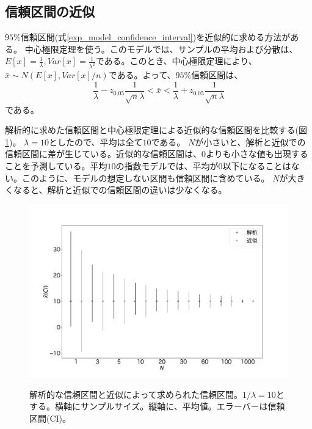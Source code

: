 \subsection{信頼区間の近似}
$95\%$信頼区間(式\ref{exp_model_confidence_interval})を近似的に求める方法がある。
中心極限定理を使う。このモデルでは、サンプルの平均および分散は、$E[x]=\frac{1}{\lambda},Var[x]=\frac{1}{\lambda^2}$である。このとき、中心極限定理により、$\bar{x}\sim N(E[x],Var[x]/n)$である。よって、$95\%$信頼区間は、
\begin{equation*}
    \frac{1}{\lambda}-z_{0.05}\frac{1}{\sqrt{n}\lambda}<\bar{x}<\frac{1}{\lambda}+z_{0.05}\frac{1}{\sqrt{n}\lambda}
\end{equation*}
である。

解析的に求めた信頼区間と中心極限定理による近似的な信頼区間を比較する(図\ref{fig:model_predict_CI_interval})。
$\lambda=10$としたので、平均は全て$10$である。
$N$が小さいと、解析と近似での信頼区間に差が生じている。近似的な信頼区間は、$0$よりも小さな値も出現することを予測している。平均$10$の指数モデルでは、平均が$0$以下になることはない。このように、モデルの想定しない区間も信頼区間に含めている。
$N$が大きくなると、解析と近似での信頼区間の違いは少なくなる。

\begin{figure}
    \begin{center}
        \includegraphics[width=15cm]{./image/12_/confidence_expon_interval.pdf}
        \label{fig:model_predict_CI_interval}
        \caption{解析的な信頼区間と近似によって求められた信頼区間。$1/\lambda=10$とする。横軸にサンプルサイズ。縦軸に、平均値。エラーバーは信頼区間(CI)。}
      \end{center}
\end{figure}

